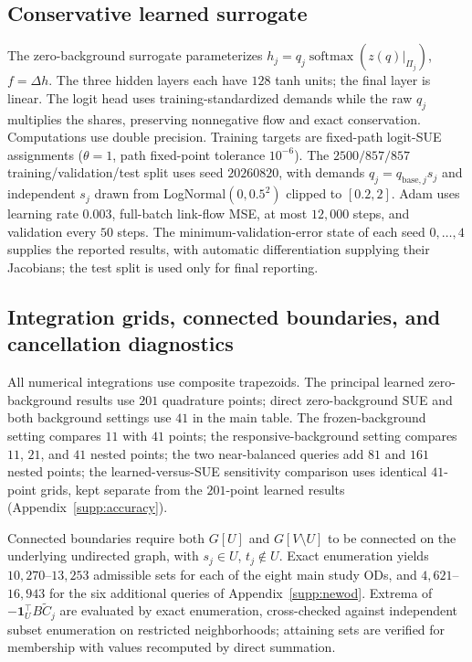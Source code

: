\subsection{Conservative learned surrogate}\label{supp:protocol}
The zero-background surrogate parameterizes
$h_j=q_j\operatorname{softmax}(z(q)|_{\Pi_j})$, $f=\Delta h$.
The three hidden layers each have $128$ tanh units; the final layer is
linear. The logit head uses training-standardized demands while the raw
$q_j$ multiplies the shares, preserving nonnegative flow and exact
conservation. Computations use double precision.
Training targets are fixed-path logit-SUE assignments ($\theta=1$,
path fixed-point tolerance $10^{-6}$). The $2500/857/857$
training/validation/test split uses seed $20260820$, with demands
$q_j=q_{\mathrm{base},j}s_j$ and independent $s_j$ drawn from
LogNormal$(0,0.5^2)$ clipped to $[0.2,2]$.
Adam uses learning rate $0.003$, full-batch link-flow MSE, at most
$12{,}000$ steps, and validation every $50$ steps. The
minimum-validation-error state of each seed $0,\ldots,4$ supplies
the reported results, with automatic differentiation supplying their
Jacobians; the test split is used only for final reporting.

\subsection{Integration grids, connected boundaries, and cancellation diagnostics}\label{supp:quadrature}
All numerical integrations use composite trapezoids. The principal
learned zero-background results use $201$ quadrature points; direct
zero-background SUE and both background settings use $41$ in the main
table. The frozen-background setting compares $11$ with $41$ points;
the responsive-background setting
compares $11$, $21$, and $41$ nested points; the two near-balanced
queries add $81$ and $161$ nested points; the learned-versus-SUE
sensitivity comparison uses identical $41$-point grids, kept separate
from the $201$-point learned results (Appendix~\ref{supp:accuracy}).

Connected boundaries require both $G[U]$ and $G[V\setminus U]$ to be
connected on the underlying undirected graph, with $s_j\in U$, $t_j\notin U$.
Exact enumeration yields $10{,}270$--$13{,}253$ admissible sets for each
of the eight main study ODs, and $4{,}621$--$16{,}943$ for the six
additional queries of Appendix~\ref{supp:newod}.
Extrema of $-\mathbf1_U^\top B\widetilde C_j$ are evaluated by exact
enumeration, cross-checked against independent subset enumeration on
restricted neighborhoods; attaining sets are verified for membership
with values recomputed by direct summation.

